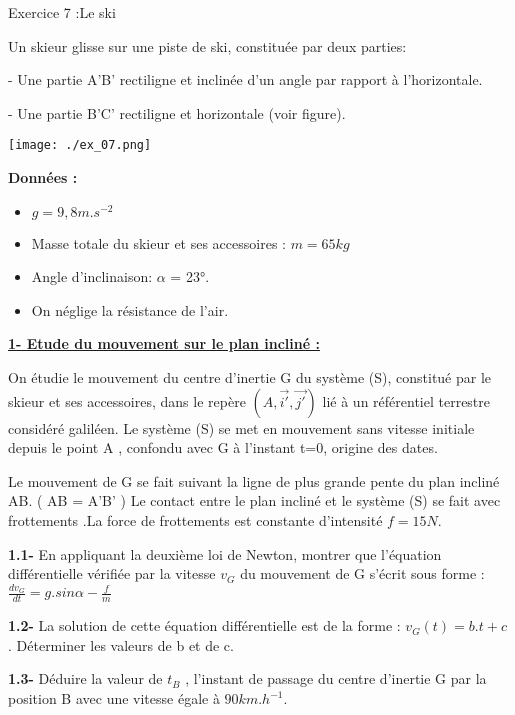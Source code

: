 \documentclass[12pt, french]{article}
\begin{document}
\begin{Box2}{Exercice 7 :Le ski }

Un skieur glisse sur une piste de ski, constituée par deux parties:

- Une partie A'B' rectiligne et inclinée d’un angle par rapport à l’horizontale.

- Une partie B'C' rectiligne et horizontale (voir figure).
  \begin{center}

	\texttt{[image: ./ex\_07.png]}
  \end{center}
\textbf{Données : }
\begin{itemize}
	\item $g = 9,8 m.s^{-2}$
	\item Masse totale du skieur et ses accessoires : $m = 65 kg$
	\item Angle d’inclinaison: $\alpha$ = 23°.
	\item On néglige la résistance de l’air.
\end{itemize}

\textbf{\underline{1- Etude du mouvement sur le plan incliné :}}

On étudie le mouvement du centre
d’inertie G du système (S), constitué par le skieur et ses 
accessoires, dans le repère $(A,\vec{i'}, \vec{j'})$ lié à un référentiel terrestre considéré galiléen.
Le système (S) se met en mouvement sans vitesse initiale depuis le point A , confondu avec G à
l’instant t=0, origine des dates.

Le mouvement de G se fait suivant la ligne de plus grande pente du plan incliné AB. ( AB = A'B' )
Le contact entre le plan incliné et le système (S) se fait avec frottements .La force de frottements
est constante d’intensité $f = 15 N$.


\textbf{1.1- }En appliquant la deuxième loi de Newton, montrer que l’équation différentielle vérifiée par la vitesse $v_G$ du mouvement de G s’écrit sous forme :$\frac{dv_G}{dt} = g.sin\alpha - \frac{f}{m}$

\textbf{1.2- }La solution de cette équation différentielle est de la forme : $v_G(t) = b.t + c$ . Déterminer les
valeurs de b et de c.

\textbf{1.3- }Déduire la valeur de $t_B$ , l’instant de passage du centre d’inertie G par la position B avec une
vitesse égale à $90 km.h^{-1}$.


\end{Box2}
\end{document}
